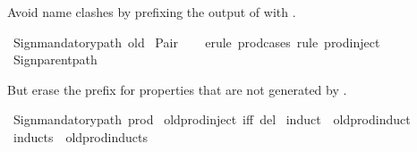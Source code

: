 \begin{isabellebody}
\isamarkupfalse%
%
\endisatagproof
{\isafoldproof}%
%
\isadelimproof
%
\endisadelimproof
%
\begin{isamarkuptext}%
Avoid name clashes by prefixing the output of  with .%
\end{isamarkuptext}\isamarkuptrue%
%
\isadelimML
%
\endisadelimML
%
\isatagML
{}\isamarkupfalse%
\ {\isacartoucheopen}Sign{\isachardot}{\kern0pt}mandatory{\isacharunderscore}{\kern0pt}path\ {\isachardoublequote}{\kern0pt}old{\isachardoublequote}{\kern0pt}{\isacartoucheclose}%
\endisatagML
{\isafoldML}%
%
\isadelimML
%
\endisadelimML
\isanewline
\isanewline
{}\isamarkupfalse%
\ Pair\isanewline
%
\isadelimproof
\ \ %
\endisadelimproof
%
\isatagproof
{}\isamarkupfalse%
\ {\isacharparenleft}{\kern0pt}erule\ prod{\isacharunderscore}{\kern0pt}cases{\isacharparenright}{\kern0pt}\ {\isacharparenleft}{\kern0pt}rule\ prod{\isachardot}{\kern0pt}inject{\isacharparenright}{\kern0pt}%
\endisatagproof
{\isafoldproof}%
%
\isadelimproof
\isanewline
%
\endisadelimproof
%
\isadelimML
\isanewline
%
\endisadelimML
%
\isatagML
{}\isamarkupfalse%
\ {\isacartoucheopen}Sign{\isachardot}{\kern0pt}parent{\isacharunderscore}{\kern0pt}path{\isacartoucheclose}%
\endisatagML
{\isafoldML}%
%
\isadelimML
%
\endisadelimML
%
\begin{isamarkuptext}%
But erase the prefix for properties that are not generated by .%
\end{isamarkuptext}\isamarkuptrue%
%
\isadelimML
%
\endisadelimML
%
\isatagML
{}\isamarkupfalse%
\ {\isacartoucheopen}Sign{\isachardot}{\kern0pt}mandatory{\isacharunderscore}{\kern0pt}path\ {\isachardoublequote}{\kern0pt}prod{\isachardoublequote}{\kern0pt}{\isacartoucheclose}%
\endisatagML
{\isafoldML}%
%
\isadelimML
%
\endisadelimML
\isanewline
\isanewline
{}\isamarkupfalse%
\ old{\isachardot}{\kern0pt}prod{\isachardot}{\kern0pt}inject\ {\isacharbrackleft}{\kern0pt}iff\ del{\isacharbrackright}{\kern0pt}\isanewline
\isanewline
{}\isamarkupfalse%
\ induct\ {\isacharequal}{\kern0pt}\ old{\isachardot}{\kern0pt}prod{\isachardot}{\kern0pt}induct\isanewline
{}\isamarkupfalse%
\ inducts\ {\isacharequal}{\kern0pt}\ old{\isachardot}{\kern0pt}prod{\isachardot}{\kern0pt}inducts\isanewline
{}\isamarkupfalse%

\end{isabellebody}
